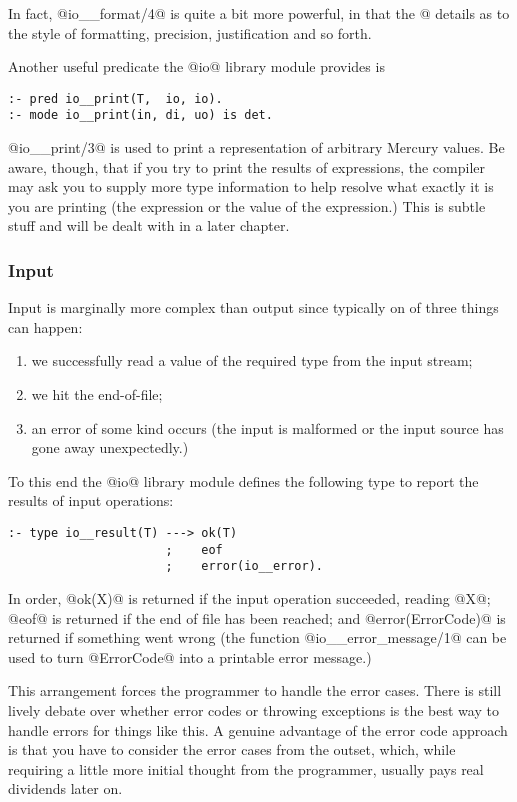 In fact, @io__format/4@ is quite a bit more powerful, in
that the @%
details as to the style of formatting, precision,
justification and so forth.

Another useful predicate the @io@ library module provides is
\begin{verbatim}
:- pred io__print(T,  io, io).
:- mode io__print(in, di, uo) is det.
\end{verbatim}
@io__print/3@ is used to print a representation of arbitrary
Mercury values.  Be aware, though, that if you try to
print the results of expressions, the compiler may ask you
to supply more type information to help resolve what
exactly it is you are printing (\ie the expression or the
value of the expression.)  This is subtle stuff and will
be dealt with in a later chapter. \XXX{}

\subsubsection{Input}

Input is marginally more complex than output since
typically on of three things can happen:
\begin{enumerate}
\item we successfully read a value of the required type from
  the input stream;
\item we hit the end-of-file;
\item an error of some kind occurs (\eg the input is
  malformed or the input source has gone away unexpectedly.)
\end{enumerate}

To this end the @io@ library module defines the following
type to report the results of input operations:
\begin{verbatim}
:- type io__result(T) ---> ok(T)
                      ;    eof
                      ;    error(io__error).
\end{verbatim}
In order, @ok(X)@ is returned if the input operation
succeeded, reading @X@; @eof@ is returned if the end of file
has been reached; and @error(ErrorCode)@ is returned if
something went wrong (the function @io__error_message/1@ can
be used to turn @ErrorCode@ into a printable error message.)

This arrangement forces the programmer to handle the error
cases.  There is still lively debate over whether error
codes or throwing exceptions is the best way to handle
errors for things like this.  A genuine advantage of the
error code approach is that you have to consider the error
cases from the outset, which, while requiring a little
more initial thought from the programmer, usually pays
real dividends later on.

